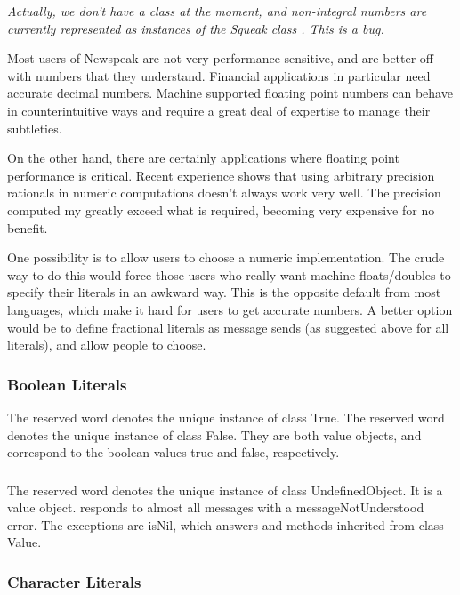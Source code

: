 \documentclass{article}
\newcommand{\code}[1]{{\sf #1}}
\begin{document}
{\it Actually, we don't have a class  at the moment, and non-integral numbers are currently represented as instances of the Squeak class . This is a bug.

Most users of Newspeak are not very performance sensitive, and are better off with numbers that they understand. Financial applications in particular need accurate decimal numbers. Machine supported floating point numbers can behave in counterintuitive ways and require a great deal of expertise to manage their subtleties.

On the other hand, there are certainly applications where floating point performance is critical. 
Recent experience shows that using arbitrary precision rationals in numeric computations doesn't always work very well. The precision computed my greatly exceed what is required, becoming very expensive for no benefit.

One possibility is to
allow users to choose a numeric implementation.  The crude way to do this would force those users who really want machine floats/doubles to specify their literals in an awkward way. This is the opposite default from most languages, which make it hard for users to get accurate numbers. A better option would be to define fractional literals as message sends (as suggested above for all literals), and allow people to choose.
}

\subsubsection{Boolean Literals}
\label{bool}

The reserved word \TRUE{ } denotes the unique instance of class \code{True}. The reserved word \FALSE{ } denotes the unique instance of class \code{False}. They are both value objects, and correspond to the boolean values true and false, respectively.  

\subsubsection{\NIL}
\label{nil}

The reserved word \NIL{ } denotes the unique instance of class \code{UndefinedObject}. It is a value object. \NIL{ } responds to almost all messages with a \code{messageNotUnderstood} error. The exceptions are \code{isNil}, which answers \TRUE{} and methods inherited from class \code{Value}.


\subsubsection{ Character Literals}
\label{char}
\end{document}
